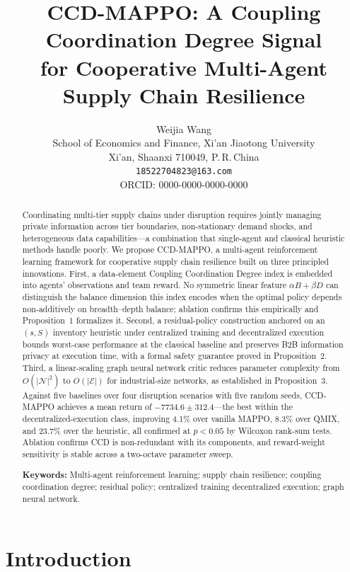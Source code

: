 \documentclass[11pt,a4paper]{article}
\title{\Large\bfseries
  CCD-MAPPO: A Coupling Coordination Degree Signal\\
  for Cooperative Multi-Agent Supply Chain Resilience}
\author{Weijia Wang\\
  \small School of Economics and Finance, Xi'an Jiaotong University\\
  \small Xi'an, Shaanxi 710049, P.\,R.\,China\\
  \small \texttt{18522704823@163.com}\\
  \small ORCID: 0000-0000-0000-0000}
\date{}
\theoremstyle{plain}
\theoremstyle{definition}
\begin{document}
\linenumbers
\maketitle
\thispagestyle{firstpage}


\begin{abstract}
Coordinating multi-tier supply chains under disruption requires jointly managing
private information across tier boundaries, non-stationary demand shocks, and
heterogeneous data capabilities---a combination that single-agent and classical heuristic
methods handle poorly.  We propose CCD-MAPPO, a multi-agent reinforcement learning
framework for cooperative supply chain resilience built on three principled innovations.
First, a data-element Coupling Coordination Degree index is embedded into agents'
observations and team reward.  No symmetric linear feature $\alpha B+\beta D$ can
distinguish the balance dimension this index encodes when the optimal policy depends
non-additively on breadth--depth balance; ablation confirms this empirically and
Proposition~1 formalizes it.
Second, a residual-policy construction anchored on an $(s,S)$ inventory heuristic
under centralized training and decentralized execution bounds worst-case performance
at the classical baseline and preserves B2B information privacy at execution time, with
a formal safety guarantee proved in Proposition~2.
Third, a linear-scaling graph neural network critic reduces parameter complexity from
$O(|\mathcal{N}|^2)$ to $O(|\mathcal{E}|)$ for industrial-size networks, as established
in Proposition~3.
Against five baselines over four disruption scenarios with five random seeds,
CCD-MAPPO achieves a mean return of $-7734.6\pm312.4$---the best within the
decentralized-execution class, improving 4.1\% over vanilla MAPPO, 8.3\% over QMIX,
and 23.7\% over the heuristic, all confirmed at $p<0.05$ by Wilcoxon rank-sum tests.
Ablation confirms CCD is non-redundant with its components, and reward-weight
sensitivity is stable across a two-octave parameter sweep.

\medskip\noindent
\textbf{Keywords:} Multi-agent reinforcement learning; supply chain resilience;
coupling coordination degree; residual policy; centralized training decentralized
execution; graph neural network.
\end{abstract}

\section{Introduction}
\label{sec:intro}
\end{document}
